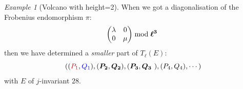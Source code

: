 \documentclass[10pt,a4paper]{beamer}
\theoremstyle{plain}
\theoremstyle{definition}
\theoremstyle{definition}
\theoremstyle{definition}
\theoremstyle{definition}
\theoremstyle{remark}
\theoremstyle{remark}
\newtheorem{exe}[thm]{Example}
\begin{document}
\begin{frame}
\begin{columns}

\begin{column}[l]{4cm}
\begin{exe}[Volcano with height=2]
When we got a diagonalisation of the Frobenius endomorphism $\pi$:
\[
\left( \begin{matrix}
\lambda & 0 \\
0 & \mu 
\end{matrix} \right) \bmod \textit{\boldmath  $\ell^3$ \unboldmath } 
\]
then we have determined a \emph{smaller} part of $T_{\ell}(E)$:
\[((\color{red}P_1 \color{black}, \color{blue}Q_1 \color{black}),(\textit{\boldmath $P_2$},\textit{\boldmath $Q_2$}),(\textit{\boldmath $P_3$},\textit{\boldmath $Q_3$ \unboldmath}), (P_4,Q_4), \cdots )\]
with $E$ of $j$-invariant $28$.
\end{exe}
\end{column}


\end{columns}
\end{frame}
\end{document}
